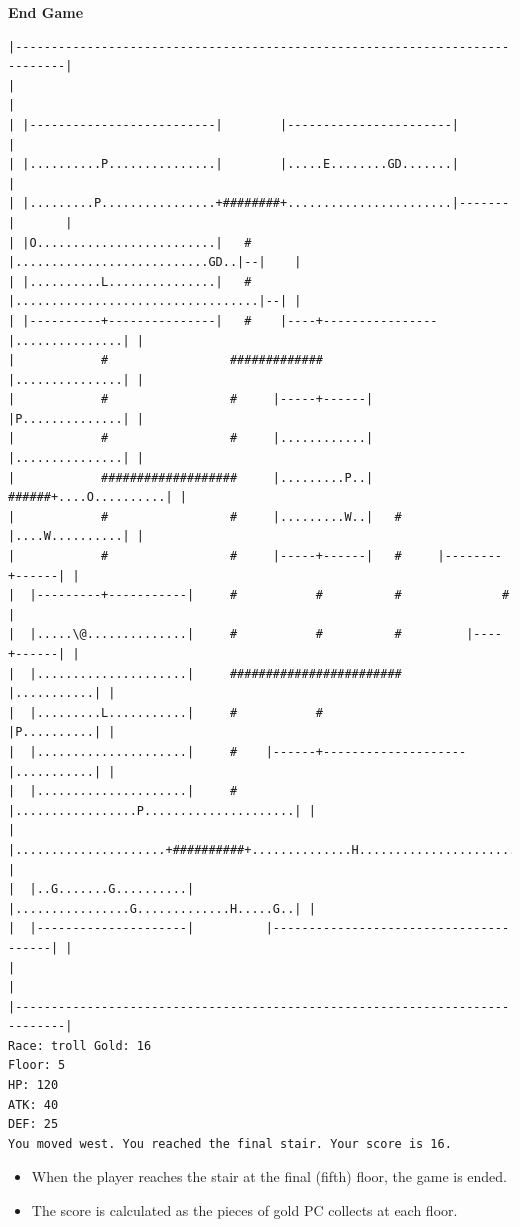 \documentclass[11pt]{article}
\theoremstyle{plain}
\begin{document}
\newpage
\textbf{End Game}


\begin{Verbatim}[fontsize=\scriptsize]
|-----------------------------------------------------------------------------|
|                                                                             |
| |--------------------------|        |-----------------------|               |
| |..........P...............|        |.....E........GD.......|               |
| |.........P................+########+.......................|-------|       |
| |O.........................|   #    |...........................GD..|--|    |
| |..........L...............|   #    |..................................|--| |
| |----------+---------------|   #    |----+----------------|...............| |
|            #                 #############                |...............| |
|            #                 #     |-----+------|         |P..............| |
|            #                 #     |............|         |...............| |
|            ###################     |.........P..|   ######+....O..........| |
|            #                 #     |.........W..|   #     |....W..........| |
|            #                 #     |-----+------|   #     |--------+------| |
|  |---------+-----------|     #           #          #              #        |
|  |.....\@..............|     #           #          #         |----+------| |
|  |.....................|     ########################         |...........| |
|  |.........L...........|     #           #                    |P..........| |
|  |.....................|     #    |------+--------------------|...........| |
|  |.....................|     #    |.................P.....................| |
|  |.....................+##########+..............H........................| |
|  |..G.......G..........|          |................G.............H.....G..| |
|  |---------------------|          |---------------------------------------| |
|                                                                             |
|-----------------------------------------------------------------------------|
Race: troll Gold: 16                                                   Floor: 5
HP: 120
ATK: 40
DEF: 25
You moved west. You reached the final stair. Your score is 16.  
\end{Verbatim}

\begin{itemize}
    \item When the player reaches the stair at the final (fifth) floor, the game
    is ended.
    \item The score is calculated as the pieces of gold PC collects at each floor.
\end{itemize}
\end{document}
